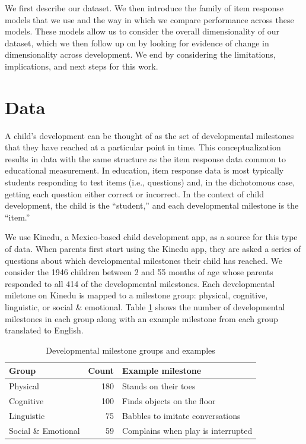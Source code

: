 \documentclass[10pt, letterpaper]{article}
\newenvironment{CodeChunk}{}{}
\begin{document}
We first describe our dataset. We then introduce the family of item
response models that we use and the way in which we compare performance
across these models. These models allow us to consider the overall
dimensionality of our dataset, which we then follow up on by looking for
evidence of change in dimensionality across development. We end by
considering the limitations, implications, and next steps for this work.

\hypertarget{data}{%
\section{Data}\label{data}}

A child's development can be thought of as the set of developmental
milestones that they have reached at a particular point in time. This
conceptualization results in data with the same structure as the item
response data common to educational measurement. In education, item
response data is most typically students responding to test items (i.e.,
questions) and, in the dichotomous case, getting each question either
correct or incorrect. In the context of child development, the child is
the ``student,'' and each developmental milestone is the ``item.''

We use Kinedu, a Mexico-based child development app, as a source for
this type of data. When parents first start using the Kinedu app, they
are asked a series of questions about which developmental milestones
their child has reached. We consider the 1946 children between 2 and 55
months of age whose parents responded to all 414 of the developmental
milestones. Each developmental miletone on Kinedu is mapped to a
milestone group: physical, cognitive, linguistic, or social \&
emotional. Table \ref{tab:examples} shows the number of developmental
milestones in each group along with an example milestone from each group
translated to English.

\begin{CodeChunk}
\begin{table}[!h]

\caption{\label{tab:examples}Developmental milestone groups and examples}
\centering
\fontsize{8}{10}\selectfont
\begin{tabular}[t]{l|r|l}
\hline
Group & Count & Example milestone\\
\hline
Physical & 180 & Stands on their toes\\
\hline
Cognitive & 100 & Finds objects on the floor\\
\hline
Linguistic & 75 & Babbles to imitate conversations\\
\hline
Social \& Emotional & 59 & Complains when play is interrupted\\
\hline
\end{tabular}
\end{table}

\end{CodeChunk}
\end{document}
